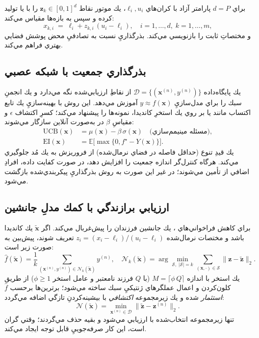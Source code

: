 براي \(d=P\) پارامتر آزاد با كران‌هاي \(\ell_i,u_i\)، يك موتور  نقاط \(\mathbf{z}_k\in[0,1]^d\) را با  يا  توليد كرده و سپس به بازه‌ها مقياس مي‌كند:
\begin{equation}
    x_{k,i}\;=\;\ell_i + z_{k,i}\,(u_i-\ell_i),\quad i=1,\dots,d,\;k=1,\dots,m,
\end{equation}
و مختصاتِ ثابت را بازنويسي مي‌كند. بذرگذاريِ  نسبت به تصادفيِ محض پوشش فضايي بهتري فراهم مي‌كند.

\subsection{بذرگذاري جمعيت با شبكه عصبي }

 يك پايگاه‌داده \(\mathcal{D}=\{(\mathbf{x}^{(n)}, y^{(n)})\}\) از نقاطِ ارزيابي‌شده نگه مي‌دارد و يك انجمنِ سبك را براي مدل‌سازيِ \(y\approx f(\mathbf{x})\) آموزش مي‌دهد. اين روش با بهينه‌سازيِ يك تابع اكتساب مانند  يا  بر روي يك استخرِ كانديدا، نمونه‌ها را پيشنهاد مي‌كند؛ كسرِ اكتشاف \(\epsilon\) و مقياسِ \(\beta\) در  به‌صورت آنلاين سازگار مي‌شوند:
\begin{align}\label{eq:UCBEI}
    \text{UCB}(\mathbf{x}) &= \mu(\mathbf{x}) - \beta\,\sigma(\mathbf{x}) \quad \text{(مسئله مينيمم‌سازي)},\\
    \text{EI}(\mathbf{x}) &= \mathbb{E}\big[\max\{0, f^{\star}-Y(\mathbf{x})\}\big].
\end{align}
يك قيدِ تنوع (حداقل فاصله در فضاي نرمال‌شده) از فروريزش به يك مُد جلوگيري مي‌كند. هرگاه كنترل‌گر اندازه جمعيت را افزايش دهد، در صورت كفايت داده، افرادِ اضافي از  تأمين مي‌شوند؛ در غير اين صورت به روش بذرگذاريِ پيكربندي‌شده بازگشت مي‌شود.

\subsection{ارزيابي برازندگي با كمك مدلِ جانشين}

براي كاهش فراخواني‌هاي ، يك جانشين  فرزندان را پيش‌غربال مي‌كند. اگر \(\tilde{\mathbf{x}}\) يك كانديدا باشد و مختصات نرمال‌شده \(z_i=(x_i-\ell_i)/(u_i-\ell_i)\) تعريف شوند، پيش‌بين به صورت زير است:
\begin{equation}
    \hat f(\tilde{\mathbf{x}})= \frac{1}{k}\sum_{(\mathbf{x}^{(n)},y^{(n)})\in\mathcal{N}_k(\tilde{\mathbf{x}})} y^{(n)},\quad \mathcal{N}_k(\tilde{\mathbf{x}})=\arg\min_{\mathcal{S},\;|\mathcal{S}|=k}\sum_{(\mathbf{x},\cdot)\in\mathcal{S}}\lVert \mathbf{z}-\tilde{\mathbf{z}}\rVert_2.
\end{equation}
يك استخر با اندازه \(M=\lceil \phi\,Q\rceil\) (با \(Q\) فرزند نامعتبر و عامل استخر \(\phi\ge1\)) از طريق كلون‌كردن و اعمال عملگرهاي ژنتيكيِ سبك ساخته مي‌شود؛ برترين‌ها برحسب \(\hat f\) \emph{استثمار} شده و يك زيرمجموعه \emph{اكتشافي} با بيشينه‌كردنِ تازگي اضافه مي‌گردد:
\begin{equation}
    \mathcal{N}(\tilde{\mathbf{x}})=\min_{\mathbf{x}^{(n)}\in\mathcal{D}}\lVert \tilde{\mathbf{z}}-\mathbf{z}^{(n)}\rVert_2.
\end{equation}
تنها زيرمجموعه انتخاب‌شده با  ارزيابي مي‌شود و بقيه حذف مي‌گردند؛ وقتي  گران است، اين كار صرفه‌جوييِ قابل توجه ايجاد مي‌كند.

